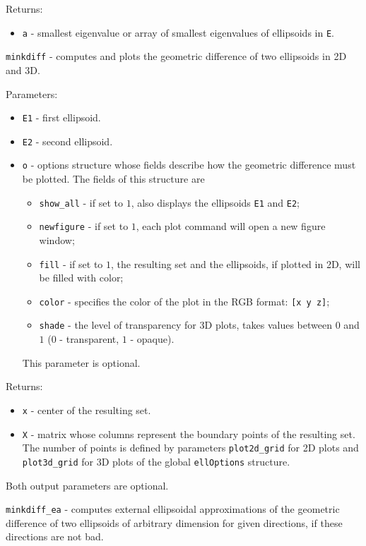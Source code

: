 Returns:
\begin{itemize}
\item {\tt a} - smallest eigenvalue or array of smallest eigenvalues of
ellipsoids in {\tt E}.
\end{itemize}

\newpage

{\Large {\tt minkdiff}} - computes and plots the geometric difference of
two ellipsoids in 2D and 3D.

Parameters:
\begin{itemize}
\item {\tt E1} - first ellipsoid.
\item {\tt E2} - second ellipsoid.
\item {\tt o} - options structure whose fields describe how the geometric
difference must be plotted. The fields of this structure are
\begin{itemize}
\item {\tt show\_all} - if set to $1$, also displays the ellipsoids
{\tt E1} and {\tt E2};
\item {\tt newfigure} - if set to $1$, each plot command will open a new
figure window;
\item {\tt fill} - if set to $1$, the resulting set and the ellipsoids,
if plotted in 2D, will be filled with color;
\item {\tt color} - specifies the color of the plot in the RGB format:
{\tt [x y z]};
\item {\tt shade} - the level of transparency for 3D plots, takes values
between $0$ and $1$ ($0$ - transparent, $1$ - opaque).
\end{itemize}
This parameter is optional.
\end{itemize}

Returns:
\begin{itemize}
\item {\tt x} - center of the resulting set.
\item {\tt X} - matrix whose columns represent the boundary points of the
resulting set. The number of points is defined by parameters
{\tt plot2d\_grid} for 2D plots and {\tt plot3d\_grid} for 3D plots of the
global {\tt ellOptions} structure.
\end{itemize}
Both output parameters are optional.

\newpage

{\Large {\tt minkdiff\_ea}} - computes external ellipsoidal approximations
of the geometric difference of two ellipsoids of arbitrary dimension
for given directions, if these directions are not bad.

